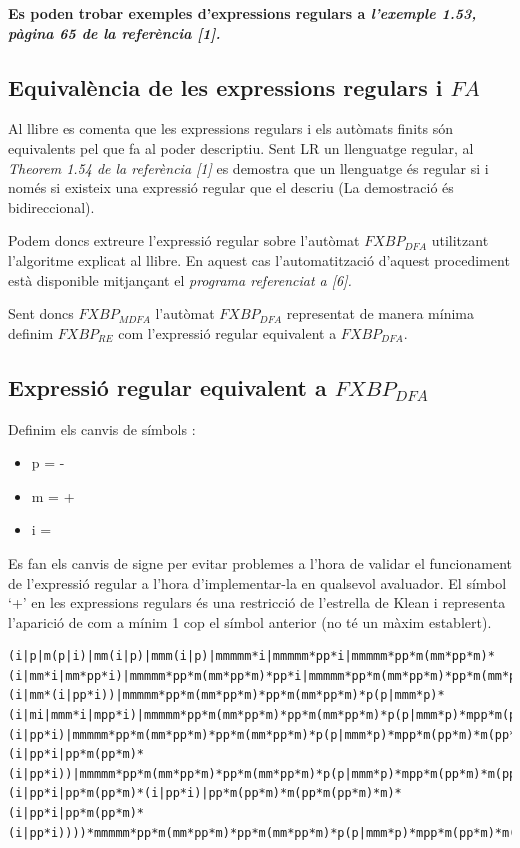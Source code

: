 \documentclass[12pt,a4paper]{report}
\def \dfa{$FXBP_{DFA} $}
\def \mfa{$FXBP_{MDFA} $}
\def \re{$FXBP_{RE} $}
\begin{document}
\textbf{Es poden trobar exemples d’expressions regulars a \textit{l’exemple 1.53, pàgina 65 de la referència [1].}}

\subsection{Equivalència de les expressions regulars i $FA$}

Al llibre es comenta que les expressions regulars i els autòmats finits són equivalents pel que fa al poder descriptiu. Sent LR un llenguatge regular, al \textit{Theorem 1.54 de la referència [1]} es demostra que un llenguatge és regular si i només si existeix una expressió regular que el descriu (La demostració és bidireccional).

Podem doncs extreure l’expressió regular sobre l’autòmat \dfa{} utilitzant l’algoritme explicat al llibre. En aquest cas l’automatització d’aquest procediment està disponible mitjançant el \textit{programa referenciat a [6].}

Sent doncs \mfa{} l’autòmat \dfa{} representat de manera mínima definim \re{} com l’expressió regular equivalent a \dfa{}.

\subsection{Expressió regular equivalent a \dfa{}}

Definim els canvis de símbols :

\begin{itemize}
\item p = -
\item m = +
\item i = \Return
\end{itemize}

Es fan els canvis de signe per evitar problemes a l’hora de validar el funcionament de l’expressió regular a l’hora d’implementar-la en qualsevol avaluador. El símbol ‘+’ en les expressions regulars és una restricció de l’estrella de Klean i representa l’aparició de com a mínim 1 cop el símbol anterior (no té un màxim establert).


\begin{lstlisting}
(i|p|m(p|i)|mm(i|p)|mmm(i|p)|mmmmm*i|mmmmm*pp*i|mmmmm*pp*m(mm*pp*m)*(i|mm*i|mm*pp*i)|mmmmm*pp*m(mm*pp*m)*pp*i|mmmmm*pp*m(mm*pp*m)*pp*m(mm*pp*m)*(i|mm*(i|pp*i))|mmmmm*pp*m(mm*pp*m)*pp*m(mm*pp*m)*p(p|mmm*p)*(i|mi|mmm*i|mpp*i)|mmmmm*pp*m(mm*pp*m)*pp*m(mm*pp*m)*p(p|mmm*p)*mpp*m(pp*m)*(i|pp*i)|mmmmm*pp*m(mm*pp*m)*pp*m(mm*pp*m)*p(p|mmm*p)*mpp*m(pp*m)*m(pp*m(pp*m)*m)*(i|pp*i|pp*m(pp*m)*(i|pp*i))|mmmmm*pp*m(mm*pp*m)*pp*m(mm*pp*m)*p(p|mmm*p)*mpp*m(pp*m)*m(pp*m(pp*m)*m)*m(pp*m(pp*m)*m(pp*m(pp*m)*m)*m)*(i|pp*i|pp*m(pp*m)*(i|pp*i)|pp*m(pp*m)*m(pp*m(pp*m)*m)*(i|pp*i|pp*m(pp*m)*(i|pp*i))))*mmmmm*pp*m(mm*pp*m)*pp*m(mm*pp*m)*p(p|mmm*p)*mpp*m(pp*m)*m(pp*m(pp*m)*m)*m(pp*m(pp*m)*m(pp*m(pp*m)*m)*m)*m(i|m|p)*
\end{lstlisting}
\end{document}
